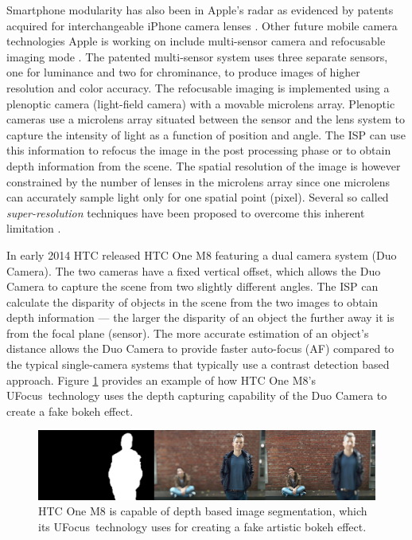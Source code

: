 \documentclass[thesis.tex]{subfiles}
\begin{document}
Smartphone modularity has also been in Apple's radar as evidenced by patents acquired for interchangeable iPhone camera lenses \cite{apple_patent_camera_module_3}\cite{apple_patent_camera_module_4}\cite{apple_patent_camera_module_5}. Other future mobile camera technologies Apple is working on include multi-sensor camera and refocusable imaging mode \cite{apple_patent_camera_module_1}\cite{apple_patent_camera_module_2}. The patented multi-sensor system uses three separate sensors, one for luminance and two for chrominance, to produce images of higher resolution and color accuracy. The refocusable imaging is implemented using a plenoptic camera (light-field camera) with a movable microlens array. Plenoptic cameras use a microlens array situated between the sensor and the lens system to capture the intensity of light as a function of position and angle. The ISP can use this information to refocus the image in the post processing phase or to obtain depth information from the scene. The spatial resolution of the image is however constrained by the number of lenses in the microlens array since one microlens can accurately sample light only for one spatial point (pixel). Several so called \textit{super-resolution} techniques have been proposed to overcome this inherent limitation \cite{plenoptic_1}\cite{plenoptic_2}\cite{plenoptic_3}.

In early 2014 HTC released HTC One M8 featuring a dual camera system (Duo Camera). The two cameras have a fixed vertical offset, which allows the Duo Camera to capture the scene from two slightly different angles. The ISP can calculate the disparity of objects in the scene from the two images to obtain depth information --- the larger the disparity of an object the further away it is from the focal plane (sensor). The more accurate estimation of an object's distance allows the Duo Camera to provide faster auto-focus (AF) compared to the typical single-camera systems that typically use a contrast detection based approach. Figure \ref{figure:htc-ufocus} provides an example of how HTC One M8's UFocus\texttrademark\ technology uses the depth capturing capability of the Duo Camera to create a fake bokeh effect.

\begin{figure}[h]
\centering \includegraphics[width=\textwidth]{images/htc-ufocus.jpg}
\caption{HTC One M8 is capable of depth based image segmentation, which its UFocus\texttrademark\ technology uses for creating a fake artistic bokeh effect.\label{figure:htc-ufocus}}
\end{figure}
\end{document}
